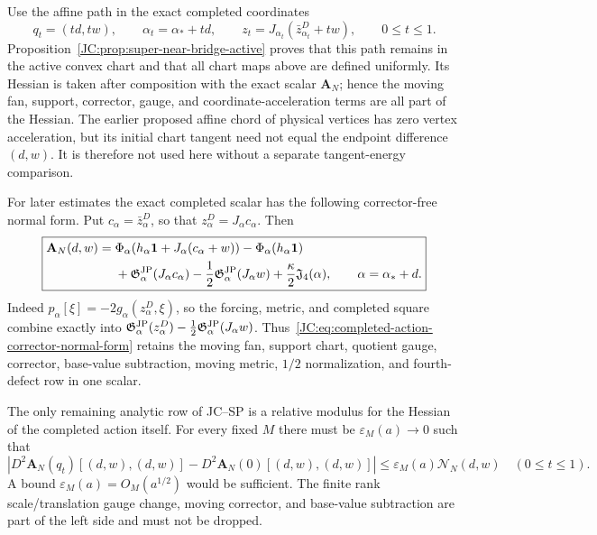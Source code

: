 \begin{contract}
Use the affine path in the exact completed coordinates
\begin{equation}\label{JC:eq:completed-coordinate-path}
 q_t=(td,tw),\qquad
 \alpha_t=\alpha_*+td,\qquad
 z_t=J_{\alpha_t}(\bar z_{\alpha_t}^D+tw),
 \qquad0\le t\le1.
\end{equation}
Proposition~\ref{JC:prop:super-near-bridge-active} proves that this path
remains in the active convex chart and that all chart maps above are
defined uniformly.  Its Hessian is taken after
composition with the exact scalar \(\mathbf A_N\); hence the moving fan,
support, corrector, gauge, and coordinate-acceleration terms are all part
of the Hessian.  The earlier proposed affine chord of physical vertices
has zero vertex acceleration, but its initial chart tangent need not equal
the endpoint difference $(d,w)$.  It is therefore not used here without a
separate tangent-energy comparison.

For later estimates the exact completed scalar has the following
corrector-free normal form.  Put $c_\alpha=\bar z_\alpha^D$, so that
$z_\alpha^D=J_\alpha c_\alpha$.  Then
\begin{equation}\label{JC:eq:completed-action-corrector-normal-form}
 \boxed{
 \begin{aligned}
 \mathbf A_N(d,w)={}&
 \Phi_\alpha\!\left(h_\alpha\mathbf1
       +J_\alpha(c_\alpha+w)\right)
 -\Phi_\alpha(h_\alpha\mathbf1)\\
 &+\mathfrak G^{\rm JP}_\alpha(J_\alpha c_\alpha)
 -\frac12\mathfrak G^{\rm JP}_\alpha(J_\alpha w)
 +\frac\kappa2\mathfrak J_4(\alpha),
 \qquad \alpha=\alpha_*+d.
 \end{aligned}}
\end{equation}
Indeed $p_\alpha[\xi]=-2g_\alpha(z_\alpha^D,\xi)$, so the forcing,
metric, and completed square combine exactly into
$\mathfrak G^{\rm JP}_\alpha(z_\alpha^D)-\frac12\mathfrak G^{\rm JP}_\alpha(J_\alpha w)$.
Thus~\eqref{JC:eq:completed-action-corrector-normal-form} retains the moving
fan, support chart, quotient gauge, corrector, base-value subtraction,
moving metric, $1/2$ normalization, and fourth-defect row in one scalar.

The only remaining analytic row of JC--SP is a relative modulus for the
Hessian of the completed action itself.  For every fixed $M$ there must be
$\varepsilon_M(a)\to0$ such that
\begin{equation}\label{JC:eq:super-near-path-modulus}
 \boxed{
 \left|D^2\mathbf A_N(q_t)[(d,w),(d,w)]
       -D^2\mathbf A_N(0)[(d,w),(d,w)]\right|
 \le\varepsilon_M(a)\mathcal N_N(d,w)
 \quad(0\le t\le1).}
\end{equation}
A bound $\varepsilon_M(a)=O_M(a^{1/2})$ would be sufficient.  The finite
rank scale/translation gauge change, moving corrector, and base-value
subtraction are part of the left side and must not be dropped.


\end{contract}
